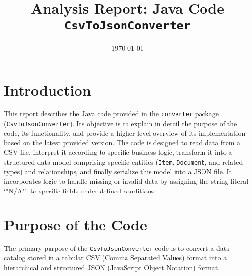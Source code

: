 \documentclass[11pt, a4paper]{article}
\title{Analysis Report: Java Code \texttt{CsvToJsonConverter} }
\date{\today}
\begin{document}
\maketitle
\thispagestyle{empty} %

\newpage
\tableofcontents %
\thispagestyle{empty} %

\newpage
\setcounter{page}{1} %

\section{Introduction}
This report describes the Java code provided in the \texttt{converter} package (\texttt{CsvToJsonConverter}). Its objective is to explain in detail the purpose of the code, its functionality, and provide a higher-level overview of its implementation based on the latest provided version. The code is designed to read data from a CSV file, interpret it according to specific business logic, transform it into a structured data model comprising specific entities (\texttt{Item}, \texttt{Document}, and related types) and relationships, and finally serialize this model into a JSON file. It incorporates logic to handle missing or invalid data by assigning the string literal `"N/A"` to specific fields under defined conditions.

\section{Purpose of the Code}
The primary purpose of the \texttt{CsvToJsonConverter} code is to convert a data catalog stored in a tabular CSV (Comma Separated Values) format into a hierarchical and structured JSON (JavaScript Object Notation) format.
\end{document}
